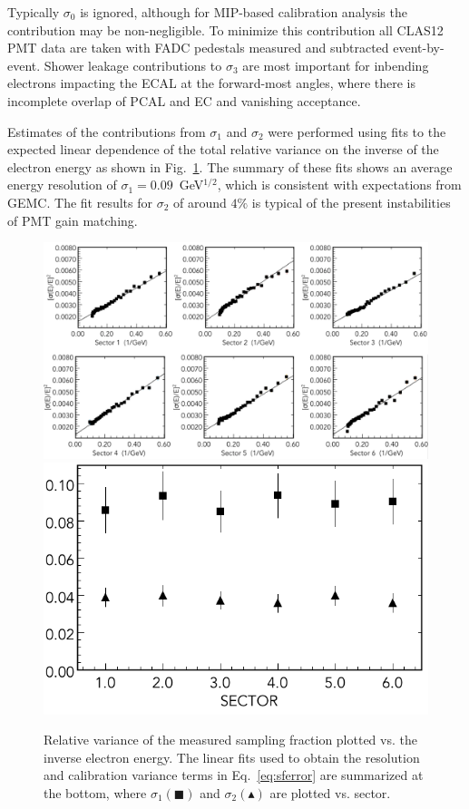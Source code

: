 Typically $\sigma_0$ is ignored, although for MIP-based calibration analysis the contribution may be non-negligible.
To minimize this contribution all CLAS12 PMT data are taken with FADC pedestals measured and subtracted
event-by-event. Shower leakage contributions to $\sigma_3$ are most important for inbending electrons impacting
the ECAL at the forward-most angles, where there is incomplete overlap of PCAL and EC and vanishing acceptance.  

Estimates of the contributions from $\sigma_1$ and $\sigma_2$ were performed using fits to the expected linear
dependence of the total relative variance on the inverse of the electron energy as shown in Fig.~\ref{fig:S10_1_1}.
The summary of these fits shows an average energy resolution of $\sigma_1 = 0.09$~GeV$^{1/2}$, which is consistent
with expectations from GEMC. The fit results for $\sigma_2$ of around $4\%$ is typical of the present instabilities
of PMT gain matching.
 
\begin{figure}[t]
\centering
\includegraphics[width=1.0\columnwidth,keepaspectratio]{img/S10_1_1.png}
\includegraphics[width=0.5\columnwidth,keepaspectratio]{img/S10_1_2.png}
\caption[]{Relative variance of the measured sampling fraction plotted vs. the inverse electron energy. The
  linear fits used to obtain the resolution and calibration variance terms in Eq.~\ref{eq:sferror} are summarized
  at the bottom, where $\sigma_1 (\blacksquare)$ and $\sigma_2 (\blacktriangle)$ are plotted vs. sector.}
\label{fig:S10_1_1}
\end{figure}

